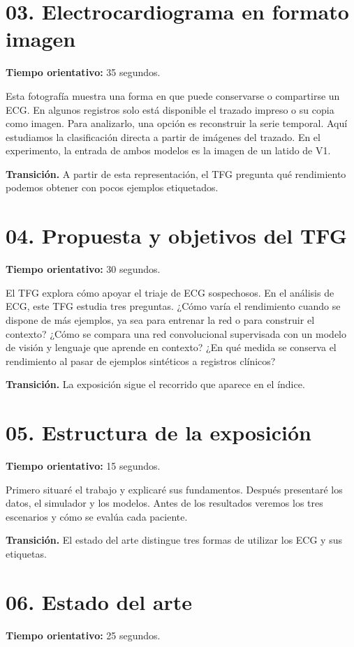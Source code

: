 \documentclass[11pt,a4paper]{article}
\begin{document}
\section*{03. Electrocardiograma en formato imagen}
\textbf{Tiempo orientativo: }35 segundos.

Esta fotografía muestra una forma en que puede conservarse o compartirse un ECG. En algunos registros solo está disponible el trazado impreso o su copia como imagen. Para analizarlo, una opción es reconstruir la serie temporal. Aquí estudiamos la clasificación directa a partir de imágenes del trazado. En el experimento, la entrada de ambos modelos es la imagen de un latido de V1.

\textbf{Transición.} A partir de esta representación, el TFG pregunta qué rendimiento podemos obtener con pocos ejemplos etiquetados.

\section*{04. Propuesta y objetivos del TFG}
\textbf{Tiempo orientativo: }30 segundos.

El TFG explora cómo apoyar el triaje de ECG sospechosos. En el análisis de ECG, este TFG estudia tres preguntas. ¿Cómo varía el rendimiento cuando se dispone de más ejemplos, ya sea para entrenar la red o para construir el contexto? ¿Cómo se compara una red convolucional supervisada con un modelo de visión y lenguaje que aprende en contexto? ¿En qué medida se conserva el rendimiento al pasar de ejemplos sintéticos a registros clínicos?

\textbf{Transición.} La exposición sigue el recorrido que aparece en el índice.

\section*{05. Estructura de la exposición}
\textbf{Tiempo orientativo: }15 segundos.

Primero situaré el trabajo y explicaré sus fundamentos. Después presentaré los datos, el simulador y los modelos. Antes de los resultados veremos los tres escenarios y cómo se evalúa cada paciente.

\textbf{Transición.} El estado del arte distingue tres formas de utilizar los ECG y sus etiquetas.

\section*{06. Estado del arte}
\textbf{Tiempo orientativo: }25 segundos.
\end{document}
